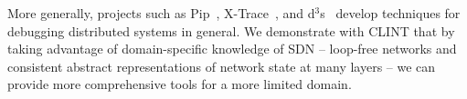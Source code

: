     More generally, projects such as Pip~\cite{pip}, X-Trace~\cite{xtrace}, and d$^3$s~\cite{d3s} develop techniques for debugging distributed systems in general.
    We demonstrate with CLINT that by taking advantage of domain-specific knowledge of SDN -- \eg{} loop-free networks and consistent abstract representations of network state at many layers -- we can provide more comprehensive tools for a more limited domain. 

